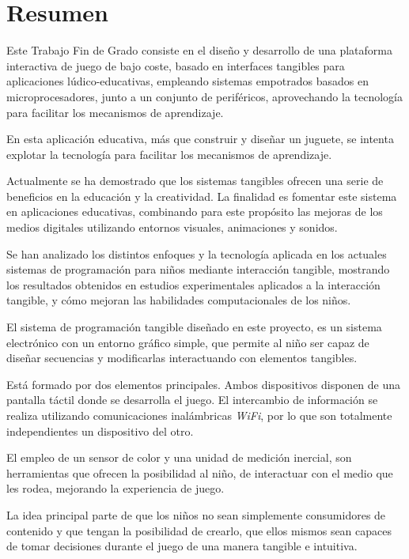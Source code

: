 \chapter{Resumen}
Este Trabajo Fin de Grado consiste en el diseño y desarrollo de una plataforma interactiva de juego de bajo coste, basado en interfaces tangibles para aplicaciones lúdico-educativas, empleando sistemas empotrados basados en microprocesadores, junto a un conjunto de periféricos, aprovechando la tecnología para facilitar los mecanismos 
de aprendizaje. 

En esta aplicación educativa, más que construir y diseñar un juguete, se intenta explotar la tecnología para facilitar los mecanismos de aprendizaje.

Actualmente se ha demostrado que los sistemas tangibles ofrecen una serie de beneficios en la educación y la creatividad. La finalidad es fomentar este sistema en aplicaciones educativas, combinando para este propósito las mejoras de los medios digitales utilizando entornos visuales, animaciones y sonidos.

Se han analizado los distintos enfoques y la tecnología aplicada en los actuales sistemas de programación para niños mediante interacción tangible, mostrando los resultados obtenidos en estudios experimentales aplicados a la interacción
tangible, y cómo mejoran las habilidades computacionales de los niños.

El sistema de programación tangible diseñado en este proyecto, es un sistema electrónico con un entorno gráfico simple, que permite al niño ser capaz de diseñar secuencias y modificarlas interactuando con elementos tangibles.

Está formado por dos elementos principales. Ambos dispositivos
disponen de una pantalla táctil donde se desarrolla el juego. El intercambio de información se realiza utilizando comunicaciones inalámbricas \emph{WiFi}, por lo que son totalmente
independientes un dispositivo del otro.

El empleo de un sensor de color y una unidad de medición inercial, son herramientas que ofrecen la posibilidad al niño, de interactuar con el medio que les rodea, mejorando la experiencia de juego.

La idea principal parte de que los niños no sean simplemente consumidores de contenido y que tengan la posibilidad de crearlo, que ellos mismos sean capaces de tomar decisiones durante el juego de una manera tangible e intuitiva.
